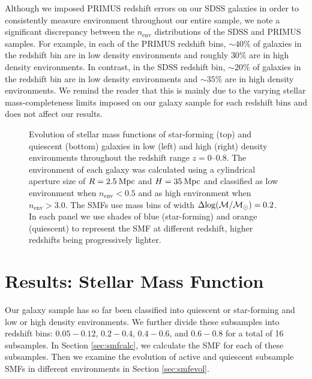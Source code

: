\documentclass{emulateapj}
\def \apradius{2.5}
\def \apheight{35}
\begin{document}
Although we imposed PRIMUS redshift errors on our SDSS galaxies in order to consistently measure environment throughout our entire sample, we note a significant discrepancy between the $n_{\mathrm{env}}$ distributions of the SDSS and PRIMUS samples. For example, in each of the PRIMUS redshift bins, $\sim 40 \%$ of galaxies in the redshift bin are in low density environments and roughly $30 \%$ are in high density environments. In contrast, in the SDSS redshift bin, $\sim 20 \%$ of galaxies in the redshift bin are in low density environments and $\sim 35 \%$ are in high density environments. We remind the reader that this is mainly due to the varying stellar mass-completeness limits imposed on our galaxy sample for each redshift bins and does not affect our results. 
\begin{figure*}
  \begin{center}
    \leavevmode
     \caption{Evolution of stellar mass functions of star-forming (top) and quiescent (bottom) galaxies in 
low (left) and high (right) density environments throughout the redshift range
$z=0$--$0.8$. The environment of each galaxy  
was calculated using a cylindrical aperture size of $R=\apradius \: \rm{Mpc}$ and $H=\apheight \: \rm{Mpc}$ and  
classified as low environment when $n_{\mathrm{env}} < 0.5$ and as high environment when $n_{\mathrm{env}} > 3.0$. The SMFs use mass bins of 
width $\Delta \rm{log}(\mathcal{M}/\mathcal{M}_{\odot})=0.2$. In each panel we use shades of blue 
(star-forming) and orange (quiescent) to represent the SMF at different redshift, higher redshifts being
progressively lighter.}      \label{fig:smf}
    \end{center}
\end{figure*}
\section{Results: Stellar Mass Function} \label{sec:smf}
Our galaxy sample has so far been classified into quiescent or
star-forming and low or high density environments. We further divide
these subsamples into redshift bins: $0.05-0.12$, $0.2-0.4$,
$0.4-0.6$, and $0.6-0.8$ for a total of 16 subsamples. In Section \ref{sec:smfcalc}, we calculate the SMF for each of these subsamples. Then we examine the evolution of active and quiescent subsample SMFs in different environments in Section \ref{sec:smfevol}.  
\end{document}
